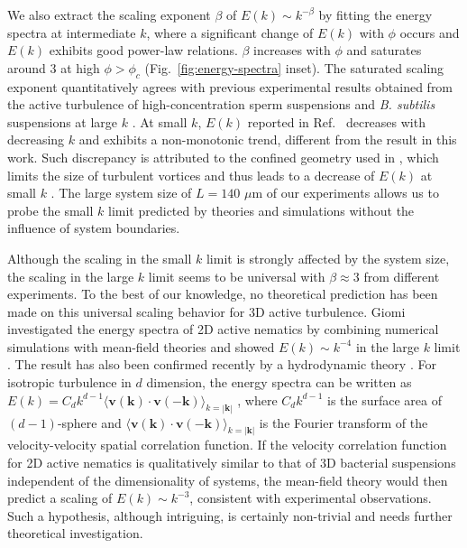 We also extract the scaling exponent $\beta$ of $E(k) \sim k^{-\beta}$ by fitting the energy spectra at intermediate $k$, where a significant change of $E(k)$ with $\phi$ occurs and $E(k)$ exhibits good power-law relations. $\beta$ increases with $\phi$ and saturates around 3 at high $\phi > \phi_c$ (Fig.~\ref{fig:energy-spectra} inset). The saturated scaling exponent quantitatively agrees with previous experimental results obtained from the active turbulence of high-concentration sperm suspensions and \textit{B. subtilis} suspensions at large $k$ \cite{Creppy2015, Wensink2012}. At small $k$, $E(k)$ reported in Ref.~\cite{Wensink2012} decreases with decreasing $k$ and exhibits a non-monotonic trend, different from the result in this work. Such discrepancy is attributed to the confined geometry used in \cite{Wensink2012}, which limits the size of turbulent vortices and thus leads to a decrease of $E(k)$ at small $k$ \cite{Guo2018}. The large system size of $L = 140$ $\mu$m of our experiments allows us to probe the small $k$ limit predicted by theories and simulations without the influence of system boundaries.

Although the scaling in the small $k$ limit is strongly affected by the system size, the scaling in the large $k$ limit seems to be universal with $\beta \approx 3$ from different experiments. To the best of our knowledge, no theoretical prediction has been made on this universal scaling behavior for 3D active turbulence. Giomi investigated the energy spectra of 2D active nematics by combining numerical simulations with mean-field theories and showed $E(k) \sim k^{-4}$ in the large $k$ limit \cite{Giomi2015}.
The result has also been confirmed recently by a hydrodynamic theory \cite{Alert2020}. For isotropic turbulence in $d$ dimension, the energy spectra can be written as $E(k) = C_d k^{d-1} \langle \mathbf{v}(\mathbf{k})\cdot \mathbf{v}(-\mathbf{k})\rangle_{k = |\mathbf{k}|}$ \cite{Wensink2012,Bardfalvy2019},
where $C_d k^{d-1}$ is the surface area of $(d-1)$-sphere and $\langle \mathbf{v}(\mathbf{k})\cdot \mathbf{v}(-\mathbf{k})\rangle_{k = |\mathbf{k}|}$ is the Fourier transform of the velocity-velocity spatial correlation function. If the velocity correlation function for 2D active nematics is qualitatively similar to that of 3D bacterial suspensions independent of the dimensionality of systems, the mean-field theory would then predict a scaling of $E(k) \sim k^{-3}$, consistent with experimental observations. Such a hypothesis, although intriguing, is certainly non-trivial and needs further theoretical investigation.

